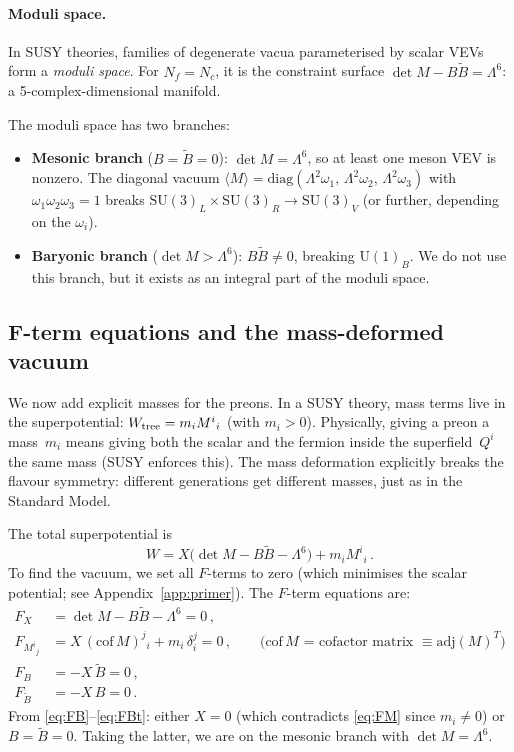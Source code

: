 \documentclass[12pt,a4paper]{article}
\newcommand{\SU}{\mathrm{SU}}
\newcommand{\UU}{\mathrm{U}}
\newcommand{\Nf}{N_f}
\newcommand{\Nc}{N_c}
\newcommand{\adj}{\mathrm{adj}}
\newcommand{\diag}{\mathrm{diag}}
\begin{document}
\paragraph{Moduli space.}
In SUSY theories, families of degenerate vacua parameterised by
scalar VEVs form a \emph{moduli space}.
For $\Nf = \Nc$, it is the constraint surface
$\det M - B\tilde B = \Lambda^6$: a 5-complex-dimensional manifold.

The moduli space has two branches:
\begin{itemize}
  \item \textbf{Mesonic branch} ($B = \tilde{B} = 0$):
    $\det M = \Lambda^6$, so at least one meson VEV is nonzero. The
    diagonal vacuum $\langle M \rangle = \diag(\Lambda^2\omega_1,\,
    \Lambda^2\omega_2,\, \Lambda^2\omega_3)$ with
    $\omega_1\omega_2\omega_3 = 1$ breaks
    $\SU(3)_L \times \SU(3)_R \to \SU(3)_V$ (or further, depending on
    the $\omega_i$).
  \item \textbf{Baryonic branch} ($\det M > \Lambda^6$): $B\tilde{B}
    \neq 0$, breaking $\UU(1)_B$. We do not use this branch, but
    it exists as an integral part of the moduli space.
\end{itemize}

\subsection{F-term equations and the mass-deformed vacuum}
\label{sec:fterms}

We now add explicit masses for the preons. In a SUSY theory, mass
terms live in the superpotential: $W_{\rm tree} = m_i M^i{}_i$
(with $m_i > 0$). Physically, giving a preon a mass~$m_i$ means
giving both the scalar and the fermion inside the superfield~$Q^i$
the same mass (SUSY enforces this).  The mass deformation explicitly
breaks the flavour symmetry: different generations get different
masses, just as in the Standard Model.

The total superpotential is
\begin{equation}
  W = X\bigl(\det M - B\tilde{B} - \Lambda^6\bigr) + m_i M^i{}_i\,.
  \label{eq:Wtot}
\end{equation}
To find the vacuum, we set all $F$-terms to zero (which minimises
the scalar potential; see Appendix~\ref{app:primer}).
The $F$-term equations are:
\begin{align}
  F_X &= \det M - B\tilde{B} - \Lambda^6 = 0\,,
    \label{eq:FX}\\
  F_{M^i{}_j} &= X\,(\text{cof}\,M)^j{}_i + m_i\,\delta^j_i = 0\,,
    \qquad\text{($\text{cof}\,M$ = cofactor matrix $\equiv \adj(M)^T$)}
    \label{eq:FM}\\
  F_B &= -X\,\tilde{B} = 0\,,
    \label{eq:FB}\\
  F_{\tilde{B}} &= -X\,B = 0\,.
    \label{eq:FBt}
\end{align}
From \eqref{eq:FB}--\eqref{eq:FBt}: either $X=0$ (which contradicts
\eqref{eq:FM} since $m_i \neq 0$) or $B = \tilde{B} = 0$. Taking the
latter, we are on the mesonic branch with $\det M = \Lambda^6$.
\end{document}
